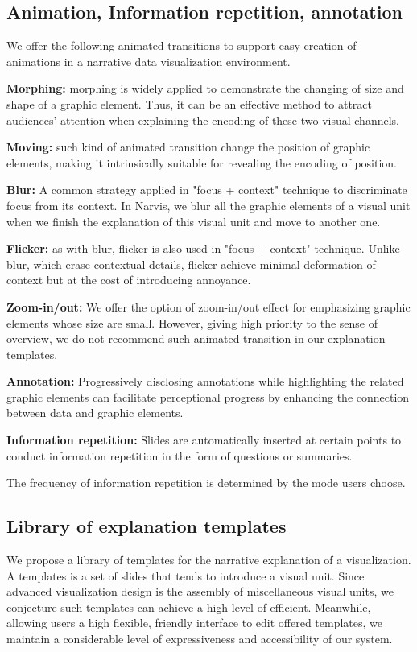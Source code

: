 \documentclass[review,journal]{vgtc}         %
\begin{document}
\subsection{Animation, Information repetition, annotation }\par
We offer the following animated transitions to support easy creation of animations in a narrative data visualization environment.\par 
\textbf{Morphing:} morphing is widely applied to demonstrate the changing of size and shape of a graphic element. Thus, it can be an effective method to attract audiences' attention when explaining the encoding of these two visual channels. \par
\textbf{Moving:} such kind of animated transition change the position of graphic elements, making it intrinsically suitable for revealing the encoding of position. \par 
\textbf{Blur:} A common strategy applied in "focus + context" technique to discriminate focus from its context. In Narvis, we blur all the graphic elements of a visual unit when we finish the explanation of this visual unit and move to another one. \par
\textbf{Flicker:} as with blur, flicker is also used in "focus + context" technique. Unlike blur, which  erase contextual details, flicker achieve minimal deformation of context but at the cost of introducing annoyance. \par
\textbf{Zoom-in/out:} We offer the option of zoom-in/out effect for emphasizing graphic elements whose size are small. However, giving high priority to the sense of overview, we do not recommend such animated transition in our explanation templates.  \par
\textbf{Annotation:} Progressively disclosing annotations while highlighting the related graphic elements can facilitate perceptional progress by enhancing the connection between data and graphic elements.\cite{bryan_temporal_2016}  \par
\textbf{Information repetition:} Slides are automatically inserted at certain points to conduct information repetition in the form of questions or summaries. \par 
The frequency of information repetition is determined by the mode users choose. \par
\subsection{Library of explanation templates}
We propose a library of templates for the narrative explanation of a visualization. A templates is a set of slides that tends to introduce a visual unit. Since advanced visualization design is the assembly of miscellaneous visual units, we conjecture such templates can achieve a high level of efficient. Meanwhile, allowing users a high flexible, friendly interface to edit offered templates, we maintain a considerable level of expressiveness and accessibility of our system. \par
\end{document}
